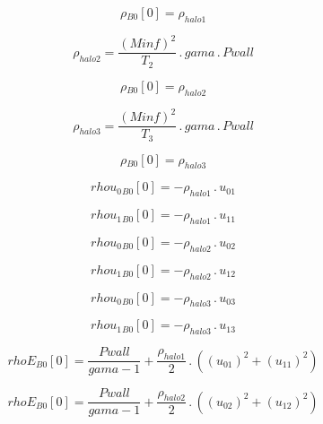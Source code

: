 \documentclass{article}
\begin{document}
\begin{dmath}{\rho{_{B0}}}[{0}] = \rho_{halo 1}\end{dmath}

\begin{dmath}\rho_{halo 2} = \frac{\left(Minf \right)^{2}}{T_{2}} \,.\, gama \,.\, Pwall\end{dmath}

\begin{dmath}{\rho{_{B0}}}[{0}] = \rho_{halo 2}\end{dmath}

\begin{dmath}\rho_{halo 3} = \frac{\left(Minf \right)^{2}}{T_{3}} \,.\, gama \,.\, Pwall\end{dmath}

\begin{dmath}{\rho{_{B0}}}[{0}] = \rho_{halo 3}\end{dmath}

\begin{dmath}{rhou_{0}{_{B0}}}[{0}] = - \rho_{halo 1} \,.\, u_{01}\end{dmath}

\begin{dmath}{rhou_{1}{_{B0}}}[{0}] = - \rho_{halo 1} \,.\, u_{11}\end{dmath}

\begin{dmath}{rhou_{0}{_{B0}}}[{0}] = - \rho_{halo 2} \,.\, u_{02}\end{dmath}

\begin{dmath}{rhou_{1}{_{B0}}}[{0}] = - \rho_{halo 2} \,.\, u_{12}\end{dmath}

\begin{dmath}{rhou_{0}{_{B0}}}[{0}] = - \rho_{halo 3} \,.\, u_{03}\end{dmath}

\begin{dmath}{rhou_{1}{_{B0}}}[{0}] = - \rho_{halo 3} \,.\, u_{13}\end{dmath}

\begin{dmath}{rhoE{_{B0}}}[{0}] = \frac{Pwall}{gama - 1} + \frac{\rho_{halo 1}}{2} \,.\, \left(\left(u_{01} \right)^{2} + \left(u_{11} \right)^{2}\right)\end{dmath}

\begin{dmath}{rhoE{_{B0}}}[{0}] = \frac{Pwall}{gama - 1} + \frac{\rho_{halo 2}}{2} \,.\, \left(\left(u_{02} \right)^{2} + \left(u_{12} \right)^{2}\right)\end{dmath}
\end{document}
